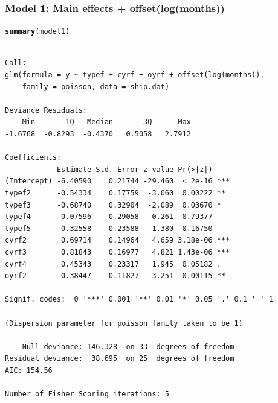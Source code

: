 \documentclass[oneside]{book}\usepackage[]{graphicx}\usepackage[svgnames]{xcolor}
\makeatletter
\newcommand{\hlstd}[1]{\textcolor[rgb]{0.345,0.345,0.345}{#1}}%
\newcommand{\hlkwd}[1]{\textcolor[rgb]{0.737,0.353,0.396}{\textbf{#1}}}%
\newenvironment{kframe}{%
 \def\at@end@of@kframe{}%
 \ifinner\ifhmode%
  \def\at@end@of@kframe{\end{minipage}}%
  \begin{minipage}{\columnwidth}%
 \fi\fi%
 \def\FrameCommand##1{\hskip\@totalleftmargin \hskip-\fboxsep
 \colorbox{shadecolor}{##1}\hskip-\fboxsep
     \hskip-\linewidth \hskip-\@totalleftmargin \hskip\columnwidth}%
 \MakeFramed {\advance\hsize-\width
   \@totalleftmargin\z@ \linewidth\hsize
   \@setminipage}}%
 {\par\unskip\endMakeFramed%
 \at@end@of@kframe}
\newenvironment{knitrout}{}{} %
\makeatother
\begin{document}
\subsubsection*{Model 1: Main effects + offset(log(months))}
\begin{knitrout}
\color{fgcolor}\begin{kframe}
\begin{alltt}
\hlkwd{summary}\hlstd{(model1)}
\end{alltt}
\begin{verbatim}

Call:
glm(formula = y ~ typef + cyrf + oyrf + offset(log(months)), 
    family = poisson, data = ship.dat)

Deviance Residuals: 
    Min       1Q   Median       3Q      Max  
-1.6768  -0.8293  -0.4370   0.5058   2.7912  

Coefficients:
            Estimate Std. Error z value Pr(>|z|)    
(Intercept) -6.40590    0.21744 -29.460  < 2e-16 ***
typef2      -0.54334    0.17759  -3.060  0.00222 ** 
typef3      -0.68740    0.32904  -2.089  0.03670 *  
typef4      -0.07596    0.29058  -0.261  0.79377    
typef5       0.32558    0.23588   1.380  0.16750    
cyrf2        0.69714    0.14964   4.659 3.18e-06 ***
cyrf3        0.81843    0.16977   4.821 1.43e-06 ***
cyrf4        0.45343    0.23317   1.945  0.05182 .  
oyrf2        0.38447    0.11827   3.251  0.00115 ** 
---
Signif. codes:  0 '***' 0.001 '**' 0.01 '*' 0.05 '.' 0.1 ' ' 1

(Dispersion parameter for poisson family taken to be 1)

    Null deviance: 146.328  on 33  degrees of freedom
Residual deviance:  38.695  on 25  degrees of freedom
AIC: 154.56

Number of Fisher Scoring iterations: 5
\end{verbatim}
\end{kframe}
\end{knitrout}
\end{document}
